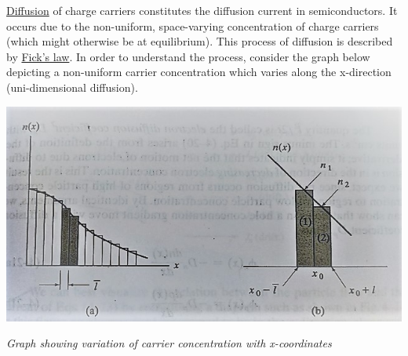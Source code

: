 \documentclass[12 pt]{article}
\begin{document}
\href{https://en.wikipedia.org/wiki/Diffusion_current}{Diffusion} of charge carriers constitutes the diffusion current in semiconductors. It occurs due to the non-uniform, space-varying concentration of charge carriers (which might otherwise be at equilibrium). This process of diffusion is described by \href{https://en.wikipedia.org/wiki/Fick%27s_laws_of_diffusion}{Fick's law}. In order to understand the process, consider the graph below depicting a non-uniform carrier concentration which varies along the x-direction (uni-dimensional diffusion).\newline

  \par
  \begin{center}
  \includegraphics{Adobe_Scan_Jun_17_2022_page-0001_1_50.jpg}
  \end{center}
   \begin{center}
       \emph{\hspace{0.8cm}Graph showing variation of carrier concentration with x-coordinates\newline}
   \end{center}
\par
\end{document}
